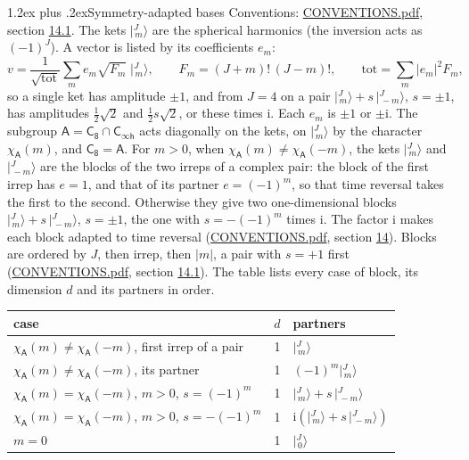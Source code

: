 \documentclass[10pt,a4paper]{article}
\makeatletter
\renewcommand\section{\@startsection{section}{1}{\z@}{-3ex plus -1ex minus -.2ex}%
  {1.2ex plus .2ex}{\normalfont\large\sffamily\bfseries\color{parttitle}}}
\numberwithin{equation}{section}
\newcommand{\grp}[1]{\mathsf{#1}}
\newcommand{\iunit}{\mathrm{i}}
\newcommand{\chiA}{\chi_{\grp{A}}}
\newcommand{\jm}[2]{\bigl\lvert{}^{#1}_{\,#2}\bigr\rangle}
\makeatother
\begin{document}
\section{Symmetry-adapted bases}\label{s:bases}
Conventions: \href{../../CONVENTIONS.pdf}{CONVENTIONS.pdf}, section \href{../../CONVENTIONS.pdf\#conv.14.1}{14.1}.
\leavevmode\label{n:index.m}\label{n:vector.ket}The kets $\jm{J}{m}$ are the spherical harmonics (the inversion acts as $(-1)^J$). \label{n:index.ketcoefficient}\label{n:vector.basis.symmetry}\label{n:index.ketweight}\label{n:index.total}A vector is listed by its coefficients $e_m$:
\begin{equation}\label{e:ket}v = \frac{1}{\sqrt{\mathrm{tot}}}\sum_m e_m\sqrt{F_m}\;\jm{J}{m},\qquad F_m = (J+m)!\,(J-m)!,\qquad \mathrm{tot} = \sum_m |e_m|^2F_m,\end{equation}
\leavevmode\label{n:index.pair.sign}so a single ket has amplitude $\pm1$, and from $J = 4$ on a pair $\jm{J}{m} + s\,\jm{J}{-m}$, $s = \pm1$, has amplitudes $\tfrac{1}{2}\sqrt{2}$ and $\tfrac{1}{2}s\sqrt{2}$, or these times $\iunit$. Each $e_m$ is $\pm1$ or $\pm\iunit$.
\leavevmode\label{n:group.A}\label{n:function.character.abelian}The subgroup $\grp{A} = \grp{C_{8}}\cap\grp{C_{\infty h}}$ acts diagonally on the kets, on $\jm{J}{m}$ by the character $\chiA(m)$, and $\grp{C_{8}} = \grp{A}$. For $m > 0$, when $\chiA(m) \ne \chiA(-m)$, the kets $\jm{J}{m}$ and $\jm{J}{-m}$ are the blocks of the two irreps of a complex pair: the block of the first irrep has $e = 1$, and that of its partner $e = (-1)^m$, so that time reversal takes the first to the second. Otherwise they give two one-dimensional blocks $\jm{J}{m} + s\,\jm{J}{-m}$, $s = \pm1$, the one with $s = -(-1)^m$ times $\iunit$. The factor $\iunit$ makes each block adapted to time reversal (\href{../../CONVENTIONS.pdf}{CONVENTIONS.pdf}, section \href{../../CONVENTIONS.pdf\#conv.14}{14}). Blocks are ordered by $J$, then irrep, then $|m|$, a pair with $s = +1$ first (\href{../../CONVENTIONS.pdf}{CONVENTIONS.pdf}, section \href{../../CONVENTIONS.pdf\#conv.14.1}{14.1}).
\leavevmode\label{n:head.case}\label{n:head.partners}The table lists every case of block, its dimension $d$ and its partners in order.
\begin{center}\begin{tabular}{@{}lrl@{}}\toprule
case & $d$ & partners\\\midrule
$\chiA(m) \ne \chiA(-m)$, first irrep of a pair & 1 & $\jm{J}{m}$\\
$\chiA(m) \ne \chiA(-m)$, its partner & 1 & $(-1)^m\jm{J}{m}$\\
$\chiA(m) = \chiA(-m)$, $m > 0$, $s = (-1)^m$ & 1 & $\jm{J}{m} + s\,\jm{J}{-m}$\\
$\chiA(m) = \chiA(-m)$, $m > 0$, $s = -(-1)^m$ & 1 & $\iunit(\jm{J}{m} + s\,\jm{J}{-m})$\\
$m = 0$ & 1 & $\jm{J}{0}$\\
\bottomrule\end{tabular}\end{center}
\end{document}
